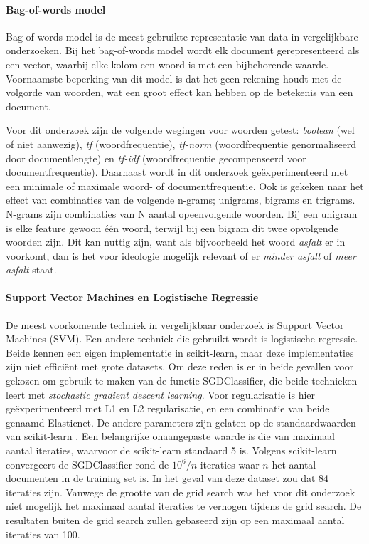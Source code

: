 \paragraph{Bag-of-words model}
Bag-of-words model is de meest gebruikte representatie van data in vergelijkbare onderzoeken. Bij het bag-of-words model wordt elk document gerepresenteerd als een vector, waarbij elke kolom een woord is met een bijbehorende waarde. Voornaamste beperking van dit model is dat het geen rekening houdt met de volgorde van woorden, wat een groot effect kan hebben op de betekenis van een document.\par
Voor dit onderzoek zijn de volgende wegingen voor woorden getest: \textit{boolean} (wel of niet aanwezig), \textit{tf} (woordfrequentie), \textit{tf-norm} (woordfrequentie genormaliseerd door documentlengte) en \textit{tf-idf} (woordfrequentie gecompenseerd voor documentfrequentie). Daarnaast wordt in dit onderzoek geëxperimenteerd met een minimale of maximale woord- of documentfrequentie. Ook is gekeken naar het effect van combinaties van de volgende n-grams; unigrams, bigrams en trigrams. N-grams zijn combinaties van N aantal opeenvolgende woorden. Bij een unigram is elke feature gewoon één woord, terwijl bij een bigram dit twee opvolgende woorden zijn. Dit kan nuttig zijn, want als bijvoorbeeld het woord \textit{asfalt} er in voorkomt, dan is het voor ideologie mogelijk relevant of er \textit{minder asfalt} of \textit{meer asfalt} staat.\par

\paragraph{Support Vector Machines en Logistische Regressie}
De meest voorkomende techniek in vergelijkbaar onderzoek is Support Vector Machines (SVM). Een andere techniek die gebruikt wordt is logistische regressie. Beide kennen een eigen implementatie in scikit-learn, maar deze implementaties zijn niet efficiënt met grote datasets. Om deze reden is er in beide gevallen voor gekozen om gebruik te maken van de functie SGDClassifier, die beide technieken leert met \textit{stochastic gradient descent learning}. Voor regularisatie is hier geëxperimenteerd met L1 en L2 regularisatie, en een combinatie van beide genaamd Elasticnet. De andere parameters zijn gelaten op de standaardwaarden van scikit-learn \cite{scikit-learn}. Een belangrijke onaangepaste waarde is die van maximaal aantal iteraties, waarvoor de scikit-learn standaard 5 is. Volgens scikit-learn convergeert de SGDClassifier rond de $10^{6}/n$ iteraties waar $n$ het aantal documenten in de training set is. In het geval van deze dataset zou dat 84 iteraties zijn. Vanwege de grootte van de grid search was het voor dit onderzoek niet mogelijk het maximaal aantal iteraties te verhogen tijdens de grid search. De resultaten buiten de grid search zullen gebaseerd zijn op een maximaal aantal iteraties van 100.\par

